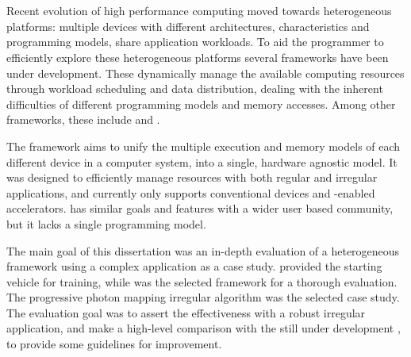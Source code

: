 \documentclass[main.tex]{subfiles}
\begin{document}
\cleardoublepage
{}
{}
\chapter*{\abstractname}

Recent evolution of high performance computing moved towards heterogeneous platforms: multiple devices with different architectures, characteristics and programming models, share application workloads. To aid the programmer to efficiently explore these heterogeneous platforms several frameworks have been under development. These dynamically manage the available computing resources through workload scheduling and data distribution, dealing with the inherent difficulties of different programming models and memory accesses. Among other frameworks, these include \gama and \starpu.

The \gama framework aims to unify the multiple execution and memory models of each different device in a computer system, into a single, hardware agnostic model. It was designed to efficiently manage resources with both regular and irregular applications, and currently only supports conventional \cpu devices and \cuda-enabled accelerators. \starpu has similar goals and features with a wider user based community, but it lacks a single programming model.

The main goal of this dissertation was an in-depth evaluation of a heterogeneous framework using a complex application as a case study. \gama provided the starting vehicle for training, while \starpu was the selected framework for a thorough evaluation. The progressive photon mapping irregular algorithm was the selected case study. The evaluation goal was to assert the \starpu effectiveness with a robust irregular application, and make a high-level comparison with the still under development \gama, to provide some guidelines for \gama improvement.
\end{document}
